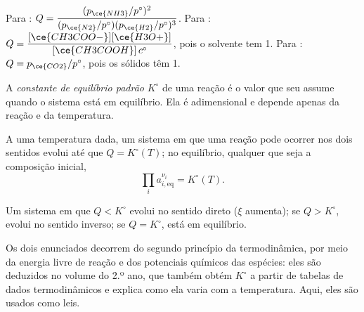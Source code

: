 \begin{example}\label{ex:b1:extent-q-and-k:quotients}
Para : $Q = \dfrac{(p_{\ce{NH3}}/p^\circ)^2}
{(p_{\ce{N2}}/p^\circ)(p_{\ce{H2}}/p^\circ)^3}$. Para
: $Q =
\dfrac{[\ce{CH3COO-}][\ce{H3O+}]}{[\ce{CH3COOH}]\,c^\circ}$, pois o
solvente tem  1. Para : $Q =
p_{\ce{CO2}}/p^\circ$, pois os sólidos têm  1.
\end{example}

\begin{definition}\label{def:b1:extent-q-and-k:equilibrium-constant}
A \emph{constante de equilíbrio padrão}
$K^\circ$ de uma reação é o valor que seu  assume
quando o sistema está em equilíbrio. Ela é adimensional e depende apenas
da reação e da temperatura.
\end{definition}

\begin{theorem}\label{thm:b1:extent-q-and-k:mass-action}
A uma temperatura dada, um sistema em que uma reação pode ocorrer nos
dois sentidos evolui até que $Q = K^\circ(T)$; no equilíbrio, qualquer
que seja a composição inicial,
\[
  \prod_i a_{i,\text{eq}}^{\nu_i} = K^\circ(T) .
\]
\end{theorem}
\admitted

\begin{proposition}\label{prop:b1:extent-q-and-k:direction}
Um sistema em que $Q < K^\circ$ evolui no sentido direto ($\xi$
aumenta); se $Q > K^\circ$, evolui no sentido inverso; se
$Q = K^\circ$, está em equilíbrio.
\end{proposition}
\admitted

\begin{remark}\label{rem:b1:extent-q-and-k:origin}
Os dois enunciados decorrem do segundo princípio da termodinâmica, por
meio da energia livre de reação e dos potenciais químicos das espécies:
eles são deduzidos no volume do 2.º ano, que também obtém $K^\circ$ a
partir de tabelas de dados termodinâmicos e explica como ela varia com a
temperatura. Aqui, eles são usados como leis.
\end{remark}


